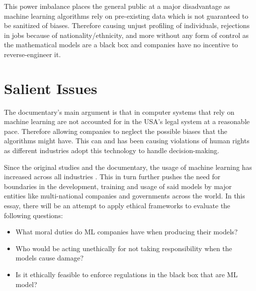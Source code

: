 This power imbalance places the general public at a major disadvantage as machine learning algorithms rely on pre-existing data which is not guaranteed to be sanitized of biases. Therefore causing unjust profiling of individuals, rejections in jobs because of nationality/ethnicity, and more without any form of control as the mathematical models are a black box and companies have no incentive to reverse-engineer it.

\section{Salient Issues}
The documentary's main argument is that in computer systems that rely on machine learning are not accounted for in the USA's legal system at a reasonable pace. Therefore allowing companies to neglect the possible biases that the algorithms might have. This can and has been causing violations of human rights as different industries adopt this technology to handle decision-making.\cite{BigBrotherWatch}

Since the original studies and the documentary, the usage of machine learning has increased across all industries \cite{ML-Growth}. This in turn further pushes the need for boundaries in the development, training and usage of said models by major entities like multi-national companies and governments across the world. In this essay, there will be an attempt to apply ethical frameworks to evaluate the following questions:

\begin{itemize}
	\item What moral duties do ML companies have when producing their models?
	\item Who would be acting unethically for not taking responsibility when the models cause damage?
	\item Is it ethically feasible to enforce regulations in the black box that are ML model?
\end{itemize}
